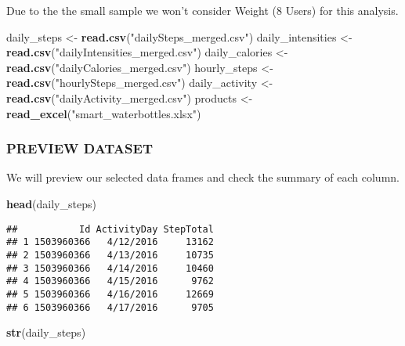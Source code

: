 \documentclass[
]{article}
\newenvironment{Shaded}{\begin{snugshade}}{\end{snugshade}}
\newcommand{\FunctionTok}[1]{\textcolor[rgb]{0.13,0.29,0.53}{\textbf{#1}}}
\newcommand{\NormalTok}[1]{#1}
\newcommand{\OtherTok}[1]{\textcolor[rgb]{0.56,0.35,0.01}{#1}}
\newcommand{\StringTok}[1]{\textcolor[rgb]{0.31,0.60,0.02}{#1}}
\begin{document}
Due to the the small sample we won't consider Weight (8 Users) for this
analysis.

\begin{Shaded}
\begin{Highlighting}[]
\NormalTok{daily\_steps }\OtherTok{\textless{}{-}} \FunctionTok{read.csv}\NormalTok{(}\StringTok{"dailySteps\_merged.csv"}\NormalTok{)}
\NormalTok{daily\_intensities }\OtherTok{\textless{}{-}} \FunctionTok{read.csv}\NormalTok{(}\StringTok{"dailyIntensities\_merged.csv"}\NormalTok{)}
\NormalTok{daily\_calories }\OtherTok{\textless{}{-}} \FunctionTok{read.csv}\NormalTok{(}\StringTok{"dailyCalories\_merged.csv"}\NormalTok{)}
\NormalTok{hourly\_steps }\OtherTok{\textless{}{-}} \FunctionTok{read.csv}\NormalTok{(}\StringTok{"hourlySteps\_merged.csv"}\NormalTok{)}
\NormalTok{daily\_activity }\OtherTok{\textless{}{-}} \FunctionTok{read.csv}\NormalTok{(}\StringTok{"dailyActivity\_merged.csv"}\NormalTok{)}
\NormalTok{products }\OtherTok{\textless{}{-}} \FunctionTok{read\_excel}\NormalTok{(}\StringTok{"smart\_waterbottles.xlsx"}\NormalTok{)}
\end{Highlighting}
\end{Shaded}

\hypertarget{preview-dataset}{%
\subsubsection{PREVIEW DATASET}\label{preview-dataset}}

We will preview our selected data frames and check the summary of each
column.

\begin{Shaded}
\begin{Highlighting}[]
\FunctionTok{head}\NormalTok{(daily\_steps)}
\end{Highlighting}
\end{Shaded}

\begin{verbatim}
##           Id ActivityDay StepTotal
## 1 1503960366   4/12/2016     13162
## 2 1503960366   4/13/2016     10735
## 3 1503960366   4/14/2016     10460
## 4 1503960366   4/15/2016      9762
## 5 1503960366   4/16/2016     12669
## 6 1503960366   4/17/2016      9705
\end{verbatim}

\begin{Shaded}
\begin{Highlighting}[]
\FunctionTok{str}\NormalTok{(daily\_steps)}
\end{Highlighting}
\end{Shaded}
\end{document}

